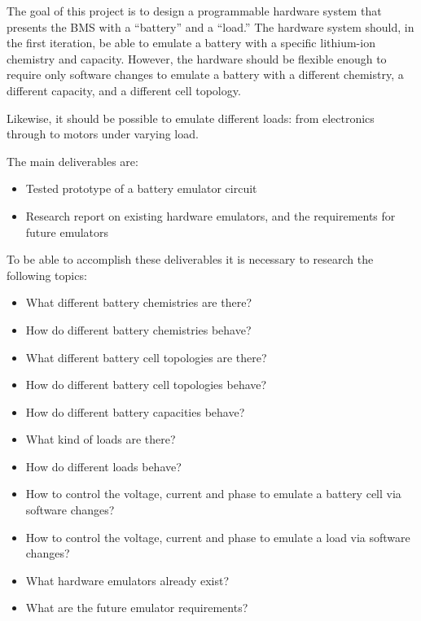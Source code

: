 

The goal of this project is to design a programmable hardware system that presents the BMS with a “battery” and a “load.” The hardware system should, in the first iteration, be able to emulate a battery with a specific lithium-ion chemistry and capacity. However, the hardware should be flexible enough to require only software changes to emulate a battery with a different chemistry, a different capacity, and a different cell topology.

Likewise, it should be possible to emulate different loads: from electronics through to motors under varying load.

The main deliverables are:
\begin{itemize}
    \item Tested prototype of a battery emulator circuit
    \item Research report on existing hardware emulators, and the requirements for future emulators
\end{itemize}

To be able to accomplish these deliverables it is necessary to research the following topics:
\begin{itemize}
    \item What different battery chemistries are there?
    \item How do different battery chemistries behave?
    \item What different battery cell topologies are there?
    \item How do different battery cell topologies behave?
    \item How do different battery capacities behave?
    \item What kind of loads are there?
    \item How do different loads behave?
    \item How to control the voltage, current and phase to emulate a battery cell via software changes?
    \item How to control the voltage, current and phase to emulate a load via software changes?
    \item What hardware emulators already exist?
    \item What are the future emulator requirements?
\end{itemize}

\newpage

